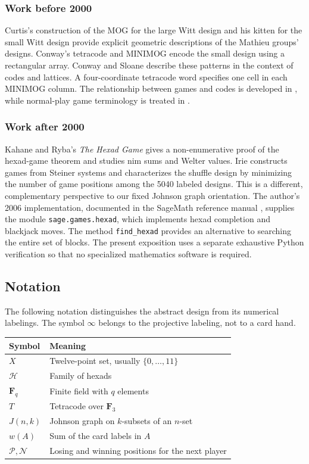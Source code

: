\documentclass[12pt,letterpaper]{article}
\theoremstyle{definition}\newtheorem{example}[theorem]{Example}
\numberwithin{equation}{section}
\newcommand{\F}{\mathbf F}
\begin{document}
\subsubsection*{Work before 2000}
Curtis's construction of the MOG for the large Witt design \cite{Cu76} and his kitten for the small Witt design \cite{Cu84} provide explicit geometric descriptions of the Mathieu groups' designs. Conway's tetracode and MINIMOG \cite{Co84} encode the small design using a rectangular array. Conway and Sloane \cite[Chapter 11, p.~321]{CS99} describe these patterns in the context of codes and lattices. A four-coordinate tetracode word specifies one cell in each MINIMOG column. The relationship between games and codes is developed in \cite{CS86}, while normal-play game terminology is treated in \cite{Co76}.

\subsubsection*{Work after 2000}
Kahane and Ryba's \emph{The Hexad Game} \cite{KR01} gives a non-enumerative proof of the hexad-game theorem and studies nim sums and Welter values. Irie \cite{Ir21} constructs games from Steiner systems and characterizes the shuffle design by minimizing the number of game positions among the 5040 labeled designs. This is a different, complementary perspective to our fixed Johnson graph orientation. The author's 2006 implementation, documented in the SageMath reference manual \cite{Jo06}, supplies the module \texttt{sage.games.hexad}, which implements hexad completion and blackjack moves. The method \texttt{find\_hexad} provides an alternative to searching the entire set of blocks. The present exposition uses a separate exhaustive Python verification so that no specialized mathematics software is required.

\subsection{Notation}
The following notation distinguishes the abstract design from its numerical labelings. The symbol $\infty$ belongs to the projective labeling, not to a card hand.

\begin{center}
\begin{tabular}{ll}\toprule
Symbol & Meaning\\\midrule
$X$ & Twelve-point set, usually $\{0,\ldots,11\}$\\
$\mathcal H$ & Family of hexads\\
$\F_q$ & Finite field with $q$ elements\\
$T$ & Tetracode over $\F_3$\\
$J(n,k)$ & Johnson graph on $k$-subsets of an $n$-set\\
$w(A)$ & Sum of the card labels in $A$\\
$\mathcal P,\mathcal N$ & Losing and winning positions for the next player\\\bottomrule
\end{tabular}
\end{center}
\end{document}
